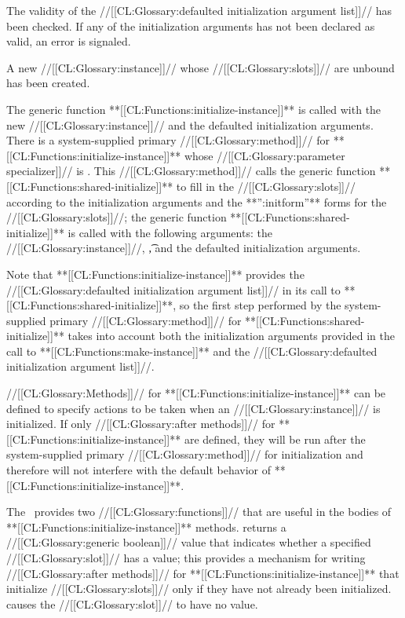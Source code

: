 \itemitem{\bull} The validity of the //[[CL:Glossary:defaulted initialization argument list]]//
has been checked.  If any of the initialization arguments has not
been declared as valid, an error is signaled. 

\itemitem{\bull} A new //[[CL:Glossary:instance]]// whose //[[CL:Glossary:slots]]// 
are unbound has been created.

\endlist
                      
The generic function **[[CL:Functions:initialize-instance]]** is called with the
new //[[CL:Glossary:instance]]// and the defaulted initialization arguments.  There is
a system-supplied primary //[[CL:Glossary:method]]// for **[[CL:Functions:initialize-instance]]**
whose //[[CL:Glossary:parameter specializer]]// is .  This
//[[CL:Glossary:method]]// calls the generic function 
**[[CL:Functions:shared-initialize]]** to fill in
the //[[CL:Glossary:slots]]// according to the initialization arguments and the 
**'':initform''** forms for the //[[CL:Glossary:slots]]//; the generic function 
**[[CL:Functions:shared-initialize]]** is called with the following arguments: the //[[CL:Glossary:instance]]//,
\t, and the defaulted initialization arguments.
           
Note that **[[CL:Functions:initialize-instance]]** provides the 
//[[CL:Glossary:defaulted initialization argument list]]// in its call to **[[CL:Functions:shared-initialize]]**,
so the first step performed by the system-supplied primary //[[CL:Glossary:method]]// for
**[[CL:Functions:shared-initialize]]** takes into account both the initialization
arguments provided in the call to **[[CL:Functions:make-instance]]** and the
//[[CL:Glossary:defaulted initialization argument list]]//.

//[[CL:Glossary:Methods]]// for **[[CL:Functions:initialize-instance]]** can be defined to specify
actions to be taken when an //[[CL:Glossary:instance]]// is initialized.  
If only //[[CL:Glossary:after methods]]// for **[[CL:Functions:initialize-instance]]** are defined, they will be
run after the system-supplied primary //[[CL:Glossary:method]]// for initialization and
therefore will not interfere with the default behavior of 
**[[CL:Functions:initialize-instance]]**.

The \OS\ provides two //[[CL:Glossary:functions]]// that are useful in the bodies of 
**[[CL:Functions:initialize-instance]]** methods.  
returns a //[[CL:Glossary:generic boolean]]// value that indicates whether a specified //[[CL:Glossary:slot]]// has a
value; this provides a mechanism for writing //[[CL:Glossary:after methods]]// for
**[[CL:Functions:initialize-instance]]** that initialize //[[CL:Glossary:slots]]// only if they have
not already been initialized.  
causes the //[[CL:Glossary:slot]]// to have no value.

